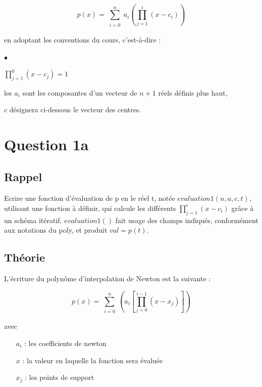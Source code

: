 \documentclass[a4paper,10pt]{report}
\begin{document}
\begin{equation}
p(x) = \sum_{\substack{i=0}}^{n} a_{i} \left(\prod_{j=1}^{i}(x-c_{i})\right)
\end{equation}

en adoptant les conventions du cours, c’est-à-dire :
\begin{list}{}{}
\item \begin{list}{$\bullet$}{}
\item $\prod^{0}_{j=1} (x-c_{j}) = 1$
\item les $a_{i}$ sont les composantes d’un vecteur de $n + 1$ réels définis plus haut,
\item $c$ désignera ci-dessous le vecteur des centres.
\end{list}
\end{list}

\section*{Question 1a}

\subsection*{Rappel}

Ecrire une fonction d’évaluation de p en le réel t, notée $evaluation1(n, a, c, t)$, utilisant une fonction à définir, qui calcule les différents $\prod_{j=1}^{i}(x-c_{i})$
grâce à un schéma itératif. $evaluation1()$ fait usage des champs indiqués, conformément aux notations du poly, et produit $val = p(t)$.

\subsection*{Théorie}

L’écriture du polynôme d’interpolation de Newton est la suivante :

\begin{equation}
p(x) = \sum_{\substack{i=0}}^{n} \left(a_{i}\left[\prod_{j=0}^{i-1}(x-x_{j})\right]\right)
\end{equation}

avec
\begin{itemize}
	\item[$a_{i}$] : les coefficients de newton
	\item[$x$]  : la valeur en laquelle la fonction sera évaluée
    \item[$x_{j}$] : les points de support
\end{itemize}
    
\end{document}
